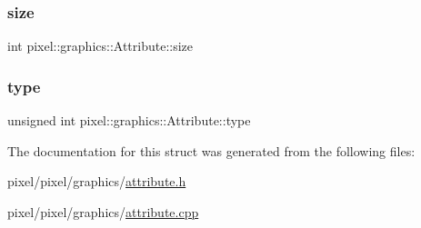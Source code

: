 \mbox{\label{structpixel_1_1graphics_1_1_attribute_a7657461b957ab3c74d3a6dc237f1581d}} 
\subsubsection{\texorpdfstring{size}{size}}
{\footnotesize\ttfamily int pixel\+::graphics\+::\+Attribute\+::size}

\mbox{\label{structpixel_1_1graphics_1_1_attribute_a47a5857b9ac8a25c031e14e083afaf59}} 
\subsubsection{\texorpdfstring{type}{type}}
{\footnotesize\ttfamily unsigned int pixel\+::graphics\+::\+Attribute\+::type}



The documentation for this struct was generated from the following files\+:\begin{DoxyCompactItemize}
\item 
pixel/pixel/graphics/\hyperlink{attribute_8h}{attribute.\+h}\item 
pixel/pixel/graphics/\hyperlink{attribute_8cpp}{attribute.\+cpp}\end{DoxyCompactItemize}
